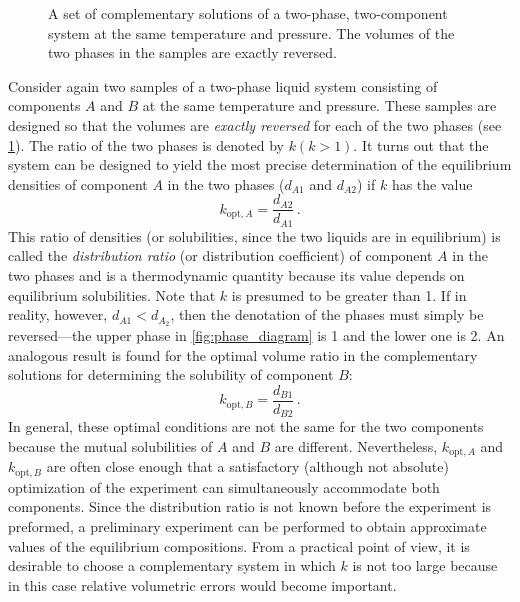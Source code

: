 \begin{figure}[tb]
	
	\caption{A set of complementary solutions of a two-phase, two-component system at the same temperature and pressure. The volumes of the two phases in the samples are exactly reversed.}
	\label{fig:two_samples_b}
\end{figure}
Consider again two samples of a two-phase liquid system consisting of components \(A\) and \(B\) at the same temperature and pressure. 
These samples are designed so that the volumes are \emph{exactly reversed} for each of the two phases (see \cref{fig:two_samples_b}). 
The ratio of the two phases is denoted by \(k (k>1)\). 
It turns out that the system can be designed to yield the most precise determination of the equilibrium densities  of component \(A\) in the two phases (\(d_{A1}\) and \(d_{A2}\)) if \(k\) has the value 
\begin{equation}
	k_{\text{opt},A} = \frac{d_{A2}}{d_{A1}} \, .
	\label{eq:optimal_ratio_a}
\end{equation}
This ratio of densities (or solubilities, since the two liquids are in equilibrium) is called the \emph{distribution ratio} (or distribution coefficient) of component \(A\) in the two phases and is a thermodynamic quantity because its value depends on equilibrium solubilities. 
Note that \(k\) is presumed to be greater than \num{1}. 
If in reality, however, \(d_{A1} < d_{A_2}\), then the denotation of the phases must simply be reversed---the upper phase in \cref{fig:phase_diagram} is \num{1} and the lower one is \num{2}. 
An analogous result is found for the optimal volume ratio in the complementary solutions for determining the solubility of component \(B\):
\begin{equation}
	k_{\text{opt},B} = \frac{d_{B1}}{d_{B2}} \, .
	\label{eq:optimal_ratio_b}
\end{equation}
In general, these optimal conditions are not the same for the two components because the mutual solubilities of \(A\) and \(B\) are different. 
Nevertheless, \(k_{\text{opt},A}\) and \(k_{\text{opt},B}\) are often close enough that a satisfactory (although not absolute) optimization of the experiment can simultaneously accommodate both components. 
Since the distribution ratio is not known before the experiment is preformed, a preliminary experiment can be performed to obtain approximate values of the equilibrium compositions. 
From a practical point of view, it is desirable to choose a complementary system in which \(k\) is not too large because in this case relative volumetric errors would become important. 

